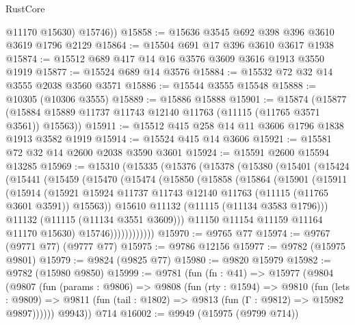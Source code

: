 \begin{lexlean}{RustCore}
\begin{coremodule}
          @11170
          @15630)
        @15746))
@15858 := @15636 @3545 @692 @398 @396 @3610 @3619 @1796 @2129
@15864 := @15504 @691 @17 @396 @3610 @3617 @1938
@15874 := @15512 @689 @417 @14 @16 @3576 @3609 @3616 @1913 @3550 @1919
@15877 := @15524 @689 @14 @3576
@15884 := @15532 @72 @32 @14 @3555 @2038 @3560 @3571
@15886 := @15544 @3555 @15548
@15888 := @10305 (@10306 @3555)
@15889 := @15886 @15888
@15901 := @15874
    (@15877 (@15884 @15889 @11737 @11743 @12140 @11763 (@11115 (@11765 @3571 @3561)) @15563))
@15911 := @15512 @415 @258 @14 @11 @3606 @1796 @1838 @1913 @3582 @1919
@15914 := @15524 @415 @14 @3606
@15921 := @15581 @72 @32 @14 @2600 @2038 @3590 @3601
@15924 := @15591 @2600 @15594 @13285
@15969 := @15310
    (@15335
      (@15376
        (@15378
          (@15380
            (@15401
              (@15424
                (@15441
                  (@15459
                    (@15470
                      (@15474
                        (@15850
                          (@15858
                            (@15864
                              (@15901
                                (@15911
                                  (@15914
                                    (@15921
                                      @15924
                                      @11737
                                      @11743
                                      @12140
                                      @11763
                                      (@11115 (@11765 @3601 @3591))
                                      @15563))
                                  @15610
                                  @11132
                                  (@11115 (@11134 @3583 @1796)))
                                @11132
                                (@11115 (@11134 @3551 @3609)))
                              @11150
                              @11154
                              @11159
                              @11164
                              @11170
                              @15630)
                            @15746))))))))))))
@15970 := @9765 @77
@15974 := @9767 (@9771 @77) (@9777 @77)
@15975 := @9786 @12156
@15977 := @9782 (@15975 @9801)
@15979 := @9824 (@9825 @77)
@15980 := @9820 @15979
@15982 := @9782 (@15980 @9850)
@15999 := @9781
    (fun (fn : @41) =>
    @15977
      (@9804
        (@9807
          (fun (params : @9806) =>
          @9808
            (fun (rty : @1594) =>
            @9810
              (fun (lets : @9809) =>
              @9811 (fun (tail : @1802) => @9813 (fun (Γ : @9812) => @15982 @9897))))))
        @9943))
    @714
@16002 := @9949 (@15975 (@9799 @714))

\end{coremodule}
\end{lexlean}
